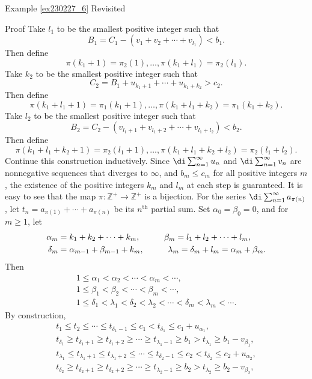 \begin{example}{\linkt Example \ref{ex230227_6} Revisited}
\begin{example}[label=ex230227_13]{}
\begin{myproof}{Proof}
Take $l_1$ to be the smallest positive integer such that
\[B_1=C_1-(v_1+v_2+\cdots+v_{l_1})<b_1.\]
Then define
\[\pi(k_1+1)=\pi_2(1),\ldots,\pi(k_1+l_1)=\pi_2(l_1).\]
Take $k_2$ to be the smallest positive integer such that
\[C_2=B_1+u_{k_1+1}+\cdots+u_{k_1+k_2}>c_2.\]
Then define
\[\pi(k_1+l_1+1)=\pi_1(k_1+1),\ldots,\pi(k_1+l_1+k_2)=\pi_1(k_1+k_2).\]
Take $l_2$ to be the smallest positive integer such that
\[B_2=C_2-\left(v_{l_1+1}+v_{l_1+2}+\cdots+v_{l_1+l_2}\right)<b_2.\] 
Then define
\[\pi(k_1+l_1+k_2+1)=\pi_2(l_1+1),\ldots,\pi(k_1+l_1+k_2+l_2)=\pi_2(l_1+l_2).\]\bp
Continue this construction inductively. Since $\di\sum_{n=1}^{\infty}u_n$ and $\di\sum_{n=1}^{\infty}v_n$ are nonnegative sequences that diverges to $\infty$, and $b_m\leq c_m$ for all positive integers $m$, the existence of the positive integers $k_m$ and $l_m$ at each step is guaranteed. It is easy to see that the map $\pi:\mathbb{Z}^+\to\mathbb{Z}^+$ is a bijection. For the series $\di\sum_{n=1}^{\infty}a_{\pi(n)}$, let $t_n=a_{\pi(1)}+\cdots+a_{\pi(n)}$ be its $n^{\text{th}}$ partial sum. Set  $\alpha_0=\beta_0=0$, and for $m\geq 1$, let
\begin{align*}
\alpha_m&= k_1  +k_{2} +\cdots+k_m,\hspace{1cm}\beta_m =  l_1 +l_{2} +\cdots +l_m,\\
\delta_m&=\alpha_{m-1}+\beta_{m-1}+k_m,\hspace{1 cm}\lambda_m=\delta_m+l_m=\alpha_m+\beta_m.\end{align*} 
Then
\begin{gather*}
1\leq \alpha_1<\alpha_2<\cdots<\alpha_m<\cdots,\\
1\leq\beta_1<\beta_2<\cdots<\beta_m<\cdots,\\
1\leq\delta_1<\lambda_1<\delta_2<\lambda_2<\cdots<\delta_m<\lambda_m<\cdots.\end{gather*}
By construction,
\begin{gather*}
t_1\leq t_2\leq\cdots\leq t_{\delta_1-1}\leq c_1<t_{\delta_1}\leq c_1+u_{\alpha_1},\\
t_{\delta_1}\geq t_{\delta_1+1}\geq t_{\delta_1+2}\geq\cdots\geq t_{\lambda_1-1}\geq b_1>
t_{\lambda_1}\geq b_1-v_{\beta_1},\\
t_{\lambda_1}\leq t_{\lambda_1+1}\leq t_{\lambda_1+2}\leq \cdots\leq t_{\delta_2-1}\leq c_2<t_{\delta_2}\leq c_2+u_{\alpha_2},\\
t_{\delta_2}\geq t_{\delta_2+1}\geq t_{\delta_2+2}\geq\cdots\geq t_{\lambda_2-1}\geq b_2>
t_{\lambda_2}\geq  b_2-v_{\beta_2},\\

\end{gather*}
\end{myproof}
\end{example}
\end{example}
